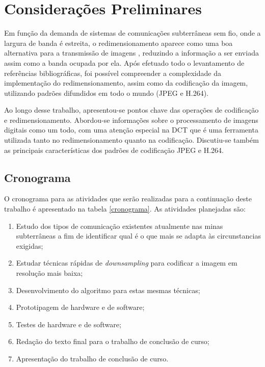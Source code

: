 \chapter[Considerações Preliminares]{Considerações Preliminares}

Em função da demanda de sistemas de comunicações subterrâneas sem fio, onde a largura de banda é estreita, o redimensionamento aparece como uma boa alternativa para a transmissão de imagens , reduzindo a informação a ser enviada assim como a banda ocupada por ela. Após efetuado todo o levantamento de referências bibliográficas, foi possível compreender a complexidade da implementação do redimensionamento, assim como da codificação da imagem, utilizando padrões difundidos em todo o mundo (JPEG e H.264).


Ao longo desse trabalho, apresentou-se pontos chave das operações de codificação e redimensionamento. Abordou-se informações sobre o processamento de imagens digitais como um todo, com uma atenção especial na DCT que é uma ferramenta utilizada tanto no redimensionamento quanto na codificação. Discutiu-se também as principais características dos padrões de codificação JPEG e H.264.

\section{Cronograma}

O cronograma para as atividades que serão realizadas para a continuação deste trabalho é apresentado na tabela \ref{cronograma}. As atividades planejadas são:
\begin{enumerate}

	\item Estudo dos tipos de comunicação existentes atualmente nas minas subterrâneas a fim de identificar qual é o que mais se adapta às circunstancias exigidas;
	\item  Estudar técnicas rápidas de \textit{downsampling} para codificar a imagem em resolução mais baixa;
	\item  Desenvolvimento do algoritmo para estas mesmas técnicas;
	\item  Prototipagem de hardware e de software;
	\item  Testes de hardware e de software;
	\item  Redação do texto final para o trabalho de conclusão de curso;
	\item Apresentação do trabalho de conclusão de curso.
\end{enumerate}

